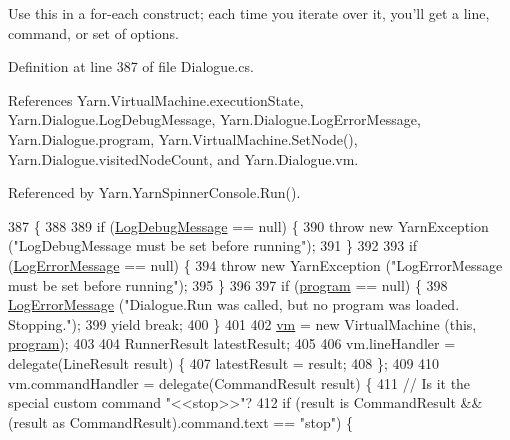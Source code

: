 Use this in a for-\/each construct; each time you iterate over it, you'll get a line, command, or set of options. 



Definition at line 387 of file Dialogue.\-cs.



References Yarn.\-Virtual\-Machine.\-execution\-State, Yarn.\-Dialogue.\-Log\-Debug\-Message, Yarn.\-Dialogue.\-Log\-Error\-Message, Yarn.\-Dialogue.\-program, Yarn.\-Virtual\-Machine.\-Set\-Node(), Yarn.\-Dialogue.\-visited\-Node\-Count, and Yarn.\-Dialogue.\-vm.



Referenced by Yarn.\-Yarn\-Spinner\-Console.\-Run().


\begin{DoxyCode}
387                                                                                              \{
388 
389             \textcolor{keywordflow}{if} (\hyperlink{a00092_a381f48bb0fbb294f8cf44ca57f11be31}{LogDebugMessage} == null) \{
390                 \textcolor{keywordflow}{throw} \textcolor{keyword}{new} YarnException (\textcolor{stringliteral}{"LogDebugMessage must be set before running"});
391             \}
392 
393             \textcolor{keywordflow}{if} (\hyperlink{a00092_a9801e83dd044d6498fdf6ebcc6bec5ac}{LogErrorMessage} == null) \{
394                 \textcolor{keywordflow}{throw} \textcolor{keyword}{new} YarnException (\textcolor{stringliteral}{"LogErrorMessage must be set before running"});
395             \}
396 
397             \textcolor{keywordflow}{if} (\hyperlink{a00092_a0a1cca92325f430425d784d416cb5c2b}{program} == null) \{
398                 \hyperlink{a00092_a9801e83dd044d6498fdf6ebcc6bec5ac}{LogErrorMessage} (\textcolor{stringliteral}{"Dialogue.Run was called, but no program was loaded.
       Stopping."});
399                 yield \textcolor{keywordflow}{break};
400             \}
401 
402             \hyperlink{a00092_a8c1319357a9df6cff051328fb33224c7}{vm} = \textcolor{keyword}{new} VirtualMachine (\textcolor{keyword}{this}, \hyperlink{a00092_a0a1cca92325f430425d784d416cb5c2b}{program});
403 
404             RunnerResult latestResult;
405 
406             vm.lineHandler = delegate(LineResult result) \{
407                 latestResult = result;
408             \};
409 
410             vm.commandHandler = delegate(CommandResult result) \{
411                 \textcolor{comment}{// Is it the special custom command "<<stop>>"?}
412                 \textcolor{keywordflow}{if} (result is CommandResult && (result as CommandResult).command.text == \textcolor{stringliteral}{"stop"}) \{

\end{DoxyCode}
